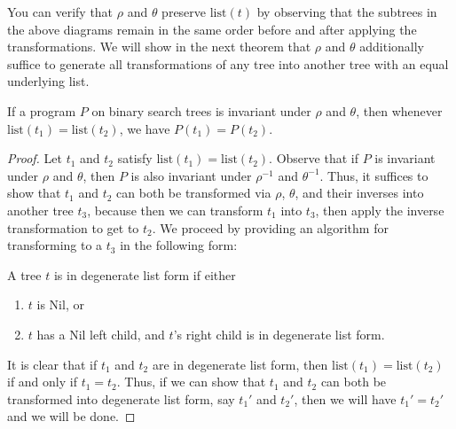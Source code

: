 \documentclass{llncs}
\begin{document}
  You can verify that $\rho$ and $\theta$ preserve $\mathrm{list}(t)$
  by observing that the subtrees in the above diagrams remain in the same order
  before and after applying the transformations.
  We will show in the next theorem that $\rho$ and $\theta$ additionally suffice
  to generate all transformations of any tree into another tree with an equal
  underlying list.

  \begin{theorem}
    If a program $P$ on binary search trees is invariant under $\rho$
    and $\theta$, then whenever $\mathrm{list}(t_1) = \mathrm{list}(t_2)$,
    we have $P(t_1) = P(t_2)$.
  \end{theorem}
  \begin{proof}
    Let $t_1$ and $t_2$ satisfy $\mathrm{list}(t_1) = \mathrm{list}(t_2)$.
    Observe that if $P$ is invariant under $\rho$ and $\theta$,
    then $P$ is also invariant under $\rho^{-1}$ and $\theta^{-1}$.
    Thus, it suffices to show that $t_1$ and $t_2$ can both be transformed
    via $\rho$, $\theta$, and their inverses into another tree $t_3$,
    because then we can transform $t_1$ into $t_3$, then apply the inverse
    transformation to get to $t_2$.
    We proceed by providing an algorithm for transforming to a $t_3$
    in the following form:

    \begin{definition}
      A tree $t$ is in degenerate list form if either
      \begin{enumerate}
        \item $t$ is Nil, or
        \item $t$ has a Nil left child, and $t$'s right child is in degenerate
          list form.
      \end{enumerate}
    \end{definition}

    It is clear that if $t_1$ and $t_2$ are in degenerate list form, then
    $\mathrm{list}(t_1) = \mathrm{list}(t_2)$ if and only if $t_1 = t_2$.
    Thus, if we can show that $t_1$ and $t_2$ can both be transformed into
    degenerate list form, say $t_1'$ and $t_2'$, then we will have $t_1' = t_2'$
    and we will be done.


\end{proof}
\end{document}
